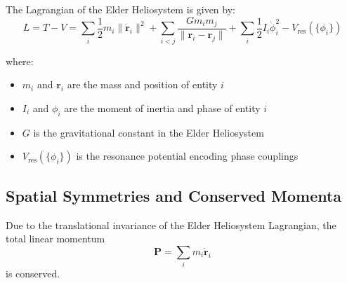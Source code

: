 \begin{definition}
The Lagrangian of the Elder Heliosystem is given by:
\begin{equation}
L = T - V = \sum_i \frac{1}{2}m_i\|\dot{\mathbf{r}}_i\|^2 + \sum_{i < j} \frac{G m_i m_j}{\|\mathbf{r}_i - \mathbf{r}_j\|} + \sum_i \frac{1}{2}I_i\dot{\phi}_i^2 - V_{\text{res}}(\{\phi_i\})
\end{equation}

where:
\begin{itemize}
    \item $m_i$ and $\mathbf{r}_i$ are the mass and position of entity $i$
    \item $I_i$ and $\phi_i$ are the moment of inertia and phase of entity $i$
    \item $G$ is the gravitational constant in the Elder Heliosystem
    \item $V_{\text{res}}(\{\phi_i\})$ is the resonance potential encoding phase couplings
\end{itemize}
\end{definition}

\subsection{Spatial Symmetries and Conserved Momenta}

\begin{theorem}
Due to the translational invariance of the Elder Heliosystem Lagrangian, the total linear momentum
\begin{equation}
\mathbf{P} = \sum_i m_i \dot{\mathbf{r}}_i
\end{equation}
is conserved.
\end{theorem}

